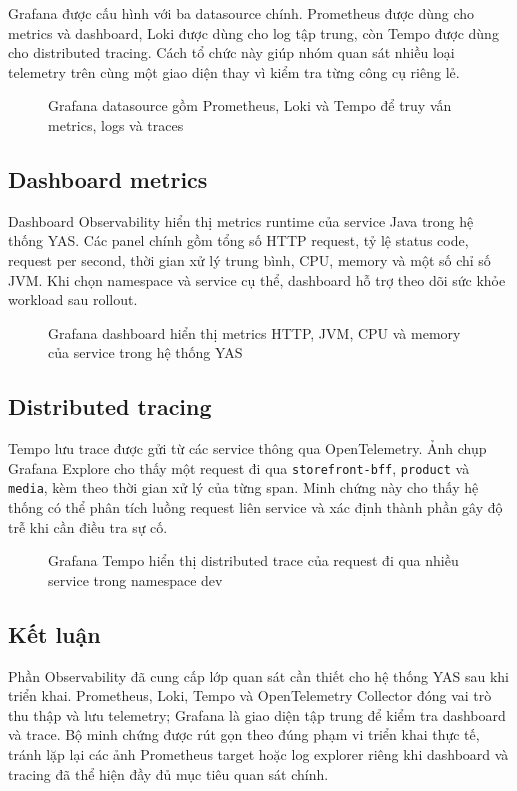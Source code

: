 Grafana được cấu hình với ba datasource chính. Prometheus được dùng cho metrics và dashboard, Loki được dùng cho log tập trung, còn Tempo được dùng cho distributed tracing. Cách tổ chức này giúp nhóm quan sát nhiều loại telemetry trên cùng một giao diện thay vì kiểm tra từng công cụ riêng lẻ.

\begin{figure}[H]
\centering
{}
\caption{Grafana datasource gồm Prometheus, Loki và Tempo để truy vấn metrics, logs và traces}
\end{figure}

\subsection{Dashboard metrics}

Dashboard Observability hiển thị metrics runtime của service Java trong hệ thống YAS. Các panel chính gồm tổng số HTTP request, tỷ lệ status code, request per second, thời gian xử lý trung bình, CPU, memory và một số chỉ số JVM. Khi chọn namespace và service cụ thể, dashboard hỗ trợ theo dõi sức khỏe workload sau rollout.

\begin{figure}[H]
\centering
{}
\caption{Grafana dashboard hiển thị metrics HTTP, JVM, CPU và memory của service trong hệ thống YAS}
\end{figure}

\subsection{Distributed tracing}

Tempo lưu trace được gửi từ các service thông qua OpenTelemetry. Ảnh chụp Grafana Explore cho thấy một request đi qua \texttt{storefront-bff}, \texttt{product} và \texttt{media}, kèm theo thời gian xử lý của từng span. Minh chứng này cho thấy hệ thống có thể phân tích luồng request liên service và xác định thành phần gây độ trễ khi cần điều tra sự cố.

\begin{figure}[H]
\centering
{}
\caption{Grafana Tempo hiển thị distributed trace của request đi qua nhiều service trong namespace dev}
\end{figure}

\subsection{Kết luận}

Phần Observability đã cung cấp lớp quan sát cần thiết cho hệ thống YAS sau khi triển khai. Prometheus, Loki, Tempo và OpenTelemetry Collector đóng vai trò thu thập và lưu telemetry; Grafana là giao diện tập trung để kiểm tra dashboard và trace. Bộ minh chứng được rút gọn theo đúng phạm vi triển khai thực tế, tránh lặp lại các ảnh Prometheus target hoặc log explorer riêng khi dashboard và tracing đã thể hiện đầy đủ mục tiêu quan sát chính.
